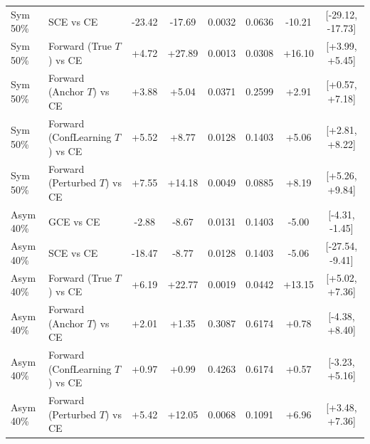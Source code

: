 \documentclass[11pt,onecolumn]{article}
\begin{document}
\begin{table}[h]
\begin{tabular}{llcccccc}
Sym 50\% & SCE vs CE & -23.42 & -17.69 & 0.0032 & 0.0636 & -10.21 & [-29.12, -17.73] \\
Sym 50\% & Forward (True $T$) vs CE & +4.72 & +27.89 & 0.0013 & 0.0308 & +16.10 & [+3.99, +5.45] \\
Sym 50\% & Forward (Anchor $T$) vs CE & +3.88 & +5.04 & 0.0371 & 0.2599 & +2.91 & [+0.57, +7.18] \\
Sym 50\% & Forward (ConfLearning $T$) vs CE & +5.52 & +8.77 & 0.0128 & 0.1403 & +5.06 & [+2.81, +8.22] \\
Sym 50\% & Forward (Perturbed $T$) vs CE & +7.55 & +14.18 & 0.0049 & 0.0885 & +8.19 & [+5.26, +9.84] \\
\midrule
Asym 40\% & GCE vs CE & -2.88 & -8.67 & 0.0131 & 0.1403 & -5.00 & [-4.31, -1.45] \\
Asym 40\% & SCE vs CE & -18.47 & -8.77 & 0.0128 & 0.1403 & -5.06 & [-27.54, -9.41] \\
Asym 40\% & Forward (True $T$) vs CE & +6.19 & +22.77 & 0.0019 & 0.0442 & +13.15 & [+5.02, +7.36] \\
Asym 40\% & Forward (Anchor $T$) vs CE & +2.01 & +1.35 & 0.3087 & 0.6174 & +0.78 & [-4.38, +8.40] \\
Asym 40\% & Forward (ConfLearning $T$) vs CE & +0.97 & +0.99 & 0.4263 & 0.6174 & +0.57 & [-3.23, +5.16] \\
Asym 40\% & Forward (Perturbed $T$) vs CE & +5.42 & +12.05 & 0.0068 & 0.1091 & +6.96 & [+3.48, +7.36] \\
\bottomrule
\end{tabular}
\end{table}
\end{document}
